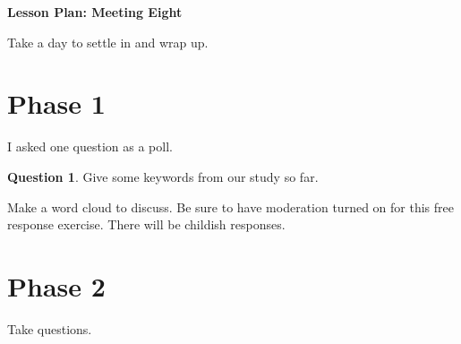\documentclass[12pt]{amsart}
\theoremstyle{definition}
\newtheorem{question}{Question}
\begin{document}
\begin{center}
\textbf{\Huge
Lesson Plan: Meeting Eight
}
\end{center}
\vspace{.5in}

Take a day to settle in and wrap up.

\section*{Phase 1}
I asked one question as a poll.

\begin{question} 
Give some keywords from our study so far. 
\end{question}

Make a word cloud to discuss. 
Be sure to have moderation turned on for this free response exercise. 
There will be childish responses.

\section*{Phase 2}
Take questions.
\end{document}
